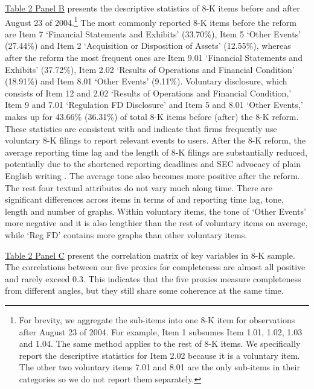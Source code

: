 \documentclass[letterpaper,12pt]{article}
\begin{document}
\begin{spacing}{1.5}
\hyperref[T2PB]{Table 2 Panel B} presents the descriptive statistics of 8-K items before and after August 23 of 2004.\footnote{For brevity, we aggregate the sub-items into one 8-K item for observations after August 23 of 2004. For example, Item 1 subsumes Item 1.01, 1.02, 1.03 and 1.04. The same method applies to the rest of 8-K items. We specifically report the descriptive statistics for Item 2.02 because it is a voluntary item. The other two voluntary items 7.01 and 8.01 are the only sub-items in their categories so we do not report them separately.} The most commonly reported 8-K items before the reform are Item 7 `Financial Statements and Exhibits' (33.70\%), Item 5 `Other Events' (27.44\%) and Item 2 `Acquisition or Disposition of Assets' (12.55\%), whereas after the reform the most frequent ones are Item 9.01 `Financial Statements and Exhibits' (37.72\%), Item 2.02 `Results of Operations and Financial Condition' (18.91\%) and Item 8.01 `Other Events' (9.11\%). Voluntary disclosure, which consists of Item 12 and 2.02 `Results of Operations and Financial Condition,' Item 9 and 7.01 `Regulation FD Disclosure' and Item 5 and 8.01 `Other Events,' makes up for 43.66\% (36.31\%) of total 8-K items before (after) the 8-K reform. These statistics are consistent with  and indicate that firms frequently use voluntary 8-K filings to report relevant events to users. After the 8-K reform, the average reporting time lag and the length of 8-K filings are substantially reduced, potentially due to the shortened reporting deadlines \cite{secFinalRuleAdditional2004} and SEC advocacy of plain English writing \cite{secDivisionCorporateFinance1999}. The average tone also becomes more positive after the reform. The rest four textual attributes do not vary much along time. There are significant differences across items in terms of and reporting time lag, tone, length and number of graphs. Within voluntary items, the tone of `Other Events' more negative and it is also lengthier than the rest of voluntary items on average, while `Reg FD' contains more graphs than other voluntary items. 

\hyperref[T2PC]{Table 2 Panel C} present the correlation matrix of key variables in 8-K sample. The correlations between our five proxies for completeness are almost all positive and rarely exceed 0.3. This indicates that the five proxies measure completeness from different angles, but they still share some coherence at the same time.


\end{spacing}
\end{document}
